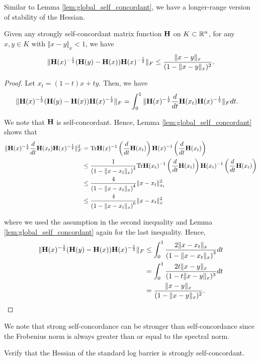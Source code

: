 Similar to Lemma \ref{lem:global_self_concordant}, we have a longer-range
version of stability of the Hessian.
\begin{lem}
\label{lem:global_strongly_self_concordant}Given any strongly self-concordant
matrix function $\mathbf{H}$ on $K\subset\mathbb{R}^{n}$, for any $x,y\in K$ with
$\Vert x-y\Vert_{x}<1$, we have
\[
\|\mathbf{H}(x)^{-\frac{1}{2}}(\mathbf{H}(y)-\mathbf{H}(x))\mathbf{H}(x)^{-\frac{1}{2}}\|_{F}\leq\frac{\|x-y\|_{x}}{(1-\|x-y\|_{x})^{2}}.
\]
\end{lem}

\begin{proof}
Let $x_{t}=(1-t)x+ty$. Then, we have
\begin{align*}
\|\mathbf{H}(x)^{-\frac{1}{2}}(\mathbf{H}(y)-\mathbf{H}(x))\mathbf{H}(x)^{-\frac{1}{2}}\|_{F} & =\int^{1}_{0}\|\mathbf{H}(x)^{-\frac{1}{2}}\frac{d}{dt}\mathbf{H}(x_{t})\mathbf{H}(x)^{-\frac{1}{2}}\|_{F}dt.
\end{align*}

We note that $\mathbf{H}$ is self-concordant. Hence, Lemma \ref{lem:global_self_concordant}
shows that
\begin{align*}
\|\mathbf{H}(x)^{-\frac{1}{2}}\frac{d}{dt}\mathbf{H}(x_{t})\mathbf{H}(x)^{-\frac{1}{2}}\|^{2}_{F} & =\mathrm{Tr}\mathbf{H}(x)^{-1}\left(\frac{d}{dt}\mathbf{H}(x_{t})\right)\mathbf{H}(x)^{-1}\left(\frac{d}{dt}\mathbf{H}(x_{t})\right)\\
 & \leq\frac{1}{\left(1-\Vert x-x_{t}\Vert_{x}\right)^{4}}\mathrm{Tr}\mathbf{H}(x_{t})^{-1}\left(\frac{d}{dt}\mathbf{H}(x_{t})\right)\mathbf{H}(x_{t})^{-1}\left(\frac{d}{dt}\mathbf{H}(x_{t})\right)\\
 & \leq\frac{4}{\left(1-\Vert x-x_{t}\Vert_{x}\right)^{4}}\|x-x_{t}\|^{2}_{x_{t}}\\
 & \leq\frac{4}{\left(1-\Vert x-x_{t}\Vert_{x}\right)^{6}}\|x-x_{t}\|^{2}_{x}
\end{align*}

where we used the assumption in the second inequality and Lemma \ref{lem:global_self_concordant}
again for the last inequality. Hence, 
\begin{align*}
\|\mathbf{H}(x)^{-\frac{1}{2}}(\mathbf{H}(y)-\mathbf{H}(x))\mathbf{H}(x)^{-\frac{1}{2}}\|_{F} & \leq\int^{1}_{0}\frac{2\|x-x_{t}\|_{x}}{\left(1-\Vert x-x_{t}\Vert_{x}\right)^{3}}dt\\
 & =\int^{1}_{0}\frac{2t\|x-y\|_{x}}{(1-t\|x-y\|_{x})^{3}}dt\\
 & =\frac{\|x-y\|_{x}}{(1-\|x-y\|_{x})^{2}}.
\end{align*}
\end{proof}
We note that strong self-concordance can be stronger than self-concordance
since the Frobenius norm is always greater than or equal to the spectral
norm. 
\begin{xca}
Verify that the Hessian of the standard log barrier is strongly self-concordant.
\end{xca}

